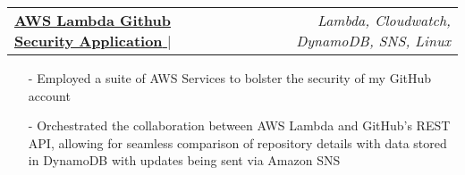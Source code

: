 \documentclass[a4paper,12pt]{article}
\begin{document}
\begin{tabularx}{\linewidth}{ @{}X r@{} }
    \href{https://github.com/IshanPhadte776/LambdaEventTriggering}{\textbf{AWS Lambda Github Security Application }} $\vert$ & \textit{Lambda, Cloudwatch, DynamoDB, SNS, Linux} \\
\end{tabularx}

\begin{minipage}{\linewidth}
\begin{itemize}[nosep,after=\strut, leftmargin=1em]
        \item[-] Employed a suite of AWS Services to bolster the security of my GitHub account
        \item[-] Orchestrated the collaboration between AWS Lambda and GitHub's REST API, allowing for seamless comparison of repository details with data stored in DynamoDB with updates being sent via Amazon SNS 
    \end{itemize}
\end{minipage}



    


\end{document}

